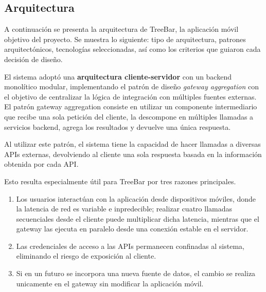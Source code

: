 \subsection{Arquitectura}

A continuación se presenta la arquitectura de TreeBar, la aplicación
móvil objetivo del proyecto. Se muestra lo siguiente: tipo de arquitectura, patrones
arquitectónicos, tecnologías  seleccionadas, así como los criterios que guiaron 
cada decisión de diseño.

El sistema adoptó una \textbf{arquitectura cliente-servidor} con un backend
monolítico modular, implementando el patrón de diseño \textit{gateway
aggregation} con el objetivo de centralizar la lógica de integración con
múltiples fuentes externas. El patrón gateway aggregation %
consiste en utilizar un componente intermediario que recibe una sola petición
del cliente, la descompone en múltiples llamadas a servicios backend, agrega los
resultados y devuelve una única respuesta.


Al utilizar este patrón, el sistema tiene la capacidad de hacer llamadas
a diversas APIs externas, devolviendo al cliente una sola respuesta basada en
la información obtenida por cada API.\@

Esto resulta especialmente útil para TreeBar por tres
razones principales. 
\begin{enumerate}
    \item Los usuarios interactúan con la aplicación desde dispositivos móviles, donde
          la latencia de red es variable e inpredecible; realizar cuatro llamadas secuenciales
          desde el cliente puede multiplicar dicha latencia, mientras que el gateway las ejecuta
          en paralelo desde una conexión estable en el servidor.
    
    \item Las credenciales de acceso a las APIs permanecen confinadas al sistema, eliminando el
          riesgo de exposición al cliente.

    \item Si en un futuro se incorpora una nueva fuente de datos, el cambio se realiza unicamente
          en el gateway sin modificar la aplicación móvil.
\end{enumerate}

